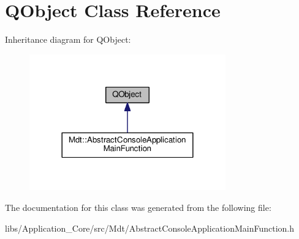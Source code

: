 \hypertarget{class_q_object}{}\section{Q\+Object Class Reference}
\label{class_q_object}


Inheritance diagram for Q\+Object\+:
\nopagebreak
\begin{figure}[H]
\begin{center}
\leavevmode
\includegraphics[width=240pt]{class_q_object__inherit__graph}
\end{center}
\end{figure}


The documentation for this class was generated from the following file\+:\begin{DoxyCompactItemize}
\item 
libs/\+Application\+\_\+\+Core/src/\+Mdt/Abstract\+Console\+Application\+Main\+Function.\+h\end{DoxyCompactItemize}
